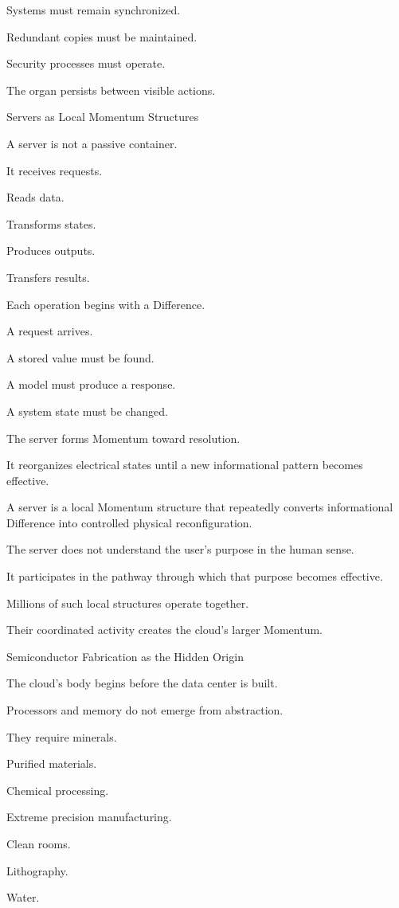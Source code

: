 Systems must remain synchronized.

Redundant copies must be maintained.

Security processes must operate.

The organ persists between visible actions.

Servers as Local Momentum Structures

A server is not a passive container.

It receives requests.

Reads data.

Transforms states.

Produces outputs.

Transfers results.

Each operation begins with a Difference.

A request arrives.

A stored value must be found.

A model must produce a response.

A system state must be changed.

The server forms Momentum toward resolution.

It reorganizes electrical states until a new informational pattern becomes effective.

A server is a local Momentum structure that repeatedly converts informational Difference into controlled physical reconfiguration.

The server does not understand the user’s purpose in the human sense.

It participates in the pathway through which that purpose becomes effective.

Millions of such local structures operate together.

Their coordinated activity creates the cloud’s larger Momentum.

Semiconductor Fabrication as the Hidden Origin

The cloud’s body begins before the data center is built.

Processors and memory do not emerge from abstraction.

They require minerals.

Purified materials.

Chemical processing.

Extreme precision manufacturing.

Clean rooms.

Lithography.

Water.

